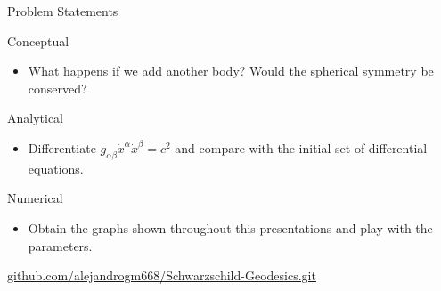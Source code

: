 \documentclass[xcolor=dvipsnames]{beamer}
\begin{document}
\begin{frame}{Problem Statements}

    \begin{block}{Conceptual}
    \begin{itemize}
        \item What happens if we add another body? Would the spherical symmetry be conserved?
    \end{itemize}
    \end{block}    
    
    \begin{block}{Analytical}
    \begin{itemize}
        \item Differentiate $g_{\alpha \beta} \dot{x}^\alpha \dot{x}^\beta = c^2$ and compare with the initial set of differential equations.
    \end{itemize}    
    \end{block}
    
    \begin{block}{Numerical}
    \begin{itemize}
        \item Obtain the graphs shown throughout this presentations and play with the parameters.
    \end{itemize}
    \end{block}
    
    \url{github.com/alejandrogm668/Schwarzschild-Geodesics.git}
    
\end{frame}
\end{document}
